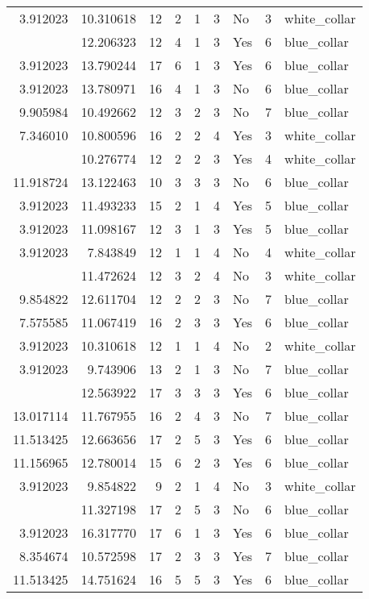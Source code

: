 \documentclass[
]{article}
\begin{document}
\begin{longtable}[t]{rrrrrllrl}
3.912023 & 10.310618 & 12 & 2 & 1 & 3 & No & 3 & white\_collar\\
\addlinespace
3.912023 & 12.206323 & 12 & 4 & 1 & 3 & Yes & 6 & blue\_collar\\
3.912023 & 13.790244 & 17 & 6 & 1 & 3 & Yes & 6 & blue\_collar\\
3.912023 & 13.780971 & 16 & 4 & 1 & 3 & No & 6 & blue\_collar\\
9.905984 & 10.492662 & 12 & 3 & 2 & 3 & No & 7 & blue\_collar\\
7.346010 & 10.800596 & 16 & 2 & 2 & 4 & Yes & 3 & white\_collar\\
\addlinespace
8.993427 & 10.276774 & 12 & 2 & 2 & 3 & Yes & 4 & white\_collar\\
11.918724 & 13.122463 & 10 & 3 & 3 & 3 & No & 6 & blue\_collar\\
3.912023 & 11.493233 & 15 & 2 & 1 & 4 & Yes & 5 & blue\_collar\\
3.912023 & 11.098167 & 12 & 3 & 1 & 3 & Yes & 5 & blue\_collar\\
3.912023 & 7.843849 & 12 & 1 & 1 & 4 & No & 4 & white\_collar\\
\addlinespace
6.309918 & 11.472624 & 12 & 3 & 2 & 4 & No & 3 & white\_collar\\
9.854822 & 12.611704 & 12 & 2 & 2 & 3 & No & 7 & blue\_collar\\
7.575585 & 11.067419 & 16 & 2 & 3 & 3 & Yes & 6 & blue\_collar\\
3.912023 & 10.310618 & 12 & 1 & 1 & 4 & No & 2 & white\_collar\\
3.912023 & 9.743906 & 13 & 2 & 1 & 3 & No & 7 & blue\_collar\\
\addlinespace
5.857933 & 12.563922 & 17 & 3 & 3 & 3 & Yes & 6 & blue\_collar\\
13.017114 & 11.767955 & 16 & 2 & 4 & 3 & No & 7 & blue\_collar\\
11.513425 & 12.663656 & 17 & 2 & 5 & 3 & Yes & 6 & blue\_collar\\
11.156965 & 12.780014 & 15 & 6 & 2 & 3 & Yes & 6 & blue\_collar\\
3.912023 & 9.854822 & 9 & 2 & 1 & 4 & No & 3 & white\_collar\\
\addlinespace
8.527143 & 11.327198 & 17 & 2 & 5 & 3 & No & 6 & blue\_collar\\
3.912023 & 16.317770 & 17 & 6 & 1 & 3 & Yes & 6 & blue\_collar\\
8.354674 & 10.572598 & 17 & 2 & 3 & 3 & Yes & 7 & blue\_collar\\
11.513425 & 14.751624 & 16 & 5 & 5 & 3 & Yes & 6 & blue\_collar\\

\end{longtable}
\end{document}
